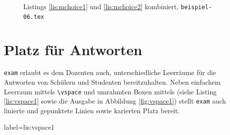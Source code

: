 \begin{figure}
\caption{Listings \ref{lis:mchoice1} und \ref{lis:mchoice2} kombiniert, \texttt{beispiel-06.tex}}\label{fig:mchoicea}
\end{figure}

\clearpage

\section{Platz für Antworten}

\texttt{exam} erlaubt es dem Dozenten auch, unterschiedliche Leerräume für die Antworten von Schülern und Studenten bereitzuhalten. 
Neben einfachem Leerraum mittels \texttt{\textbackslash vspace} und umrahmten Boxen mittels (siehe Listing \ref{lis:vspace1} sowie die Ausgabe in Abbildung \ref{fig:vspace1}) stellt \texttt{exam} auch linierte und gepunktete Linien sowie karierten Platz bereit.

\begin{lfgwcode}{label={lis:vspace1}}
\vspace{<Länge>}

\newpage


\newpage
\end{lfgwcode}

